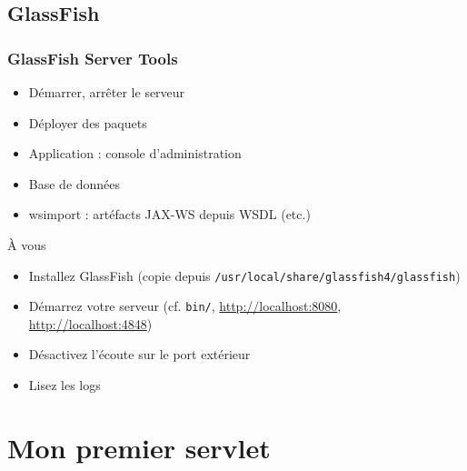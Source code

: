 \documentclass[english, french]{beamer}
\begin{document}
\subsection{GlassFish}
\begin{frame}
	\frametitle{GlassFish Server Tools}
	\begin{itemize}
		\item Démarrer, arrêter le serveur
		\item Déployer des paquets
		\item Application : console d’administration
		\item Base de données
		\item wsimport : artéfacts JAX-WS depuis WSDL (etc.)
	\end{itemize}
	\begin{block}{À vous}
		\begin{itemize}
			\item \og{}Installez\fg{} GlassFish (copie depuis \texttt{/usr/local/share/glassfish4/glassfish})
			\item Démarrez votre serveur (cf. \texttt{bin/}, \url{http://localhost:8080}, \url{http://localhost:4848})
			\item Désactivez l’écoute sur le port extérieur
			\item Lisez les logs
		\end{itemize}
	\end{block}
\end{frame}

\section[Un servlet]{Mon premier servlet}
\end{document}
